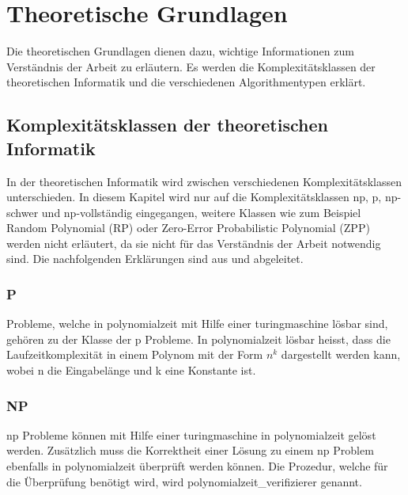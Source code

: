 %
%

\chapter{Theoretische Grundlagen}\label{chap.einleitung}
Die theoretischen Grundlagen dienen dazu, wichtige Informationen zum Verständnis der Arbeit zu erläutern. Es werden die Komplexitätsklassen der theoretischen Informatik und die verschiedenen 
Algorithmentypen erklärt.

\section{Komplexitätsklassen der theoretischen Informatik}\label{cat_theo_inf}
In der theoretischen Informatik wird zwischen verschiedenen Komplexitätsklassen unterschieden. In diesem Kapitel wird nur auf die Komplexitätsklassen \gls{np}, \gls{p}, \gls{np}-schwer und 
\gls{np}-vollständig eingegangen, weitere Klassen wie zum Beispiel Random Polynomial (RP) oder Zero-Error Probabilistic Polynomial (ZPP) werden nicht erläutert, da sie nicht für das Verständnis der 
Arbeit notwendig sind. Die nachfolgenden Erklärungen sind aus \cite{hopcroft2011einfuehrung} und \cite{slides_p_np} abgeleitet.

\subsection{P}\label{p_complet}
Probleme, welche in \gls{polynomialzeit} mit Hilfe einer  \gls{turingmaschine} lösbar sind, gehören zu der Klasse der \gls{p} Probleme. In 
\gls{polynomialzeit} lösbar heisst, dass die Laufzeitkomplexität in einem Polynom mit der Form $n^k$ dargestellt werden kann, wobei n die Eingabelänge und k eine Konstante ist.

\subsection{NP}\label{np}
\gls{np} Probleme können mit Hilfe einer  \gls{turingmaschine} in \gls{polynomialzeit} gelöst werden. Zusätzlich muss die Korrektheit einer 
Lösung zu einem \gls{np} Problem ebenfalls in \gls{polynomialzeit} überprüft werden können. Die Prozedur, welche für die Überprüfung benötigt wird, wird \gls{polynomialzeit_verifizierer} 
genannt.

